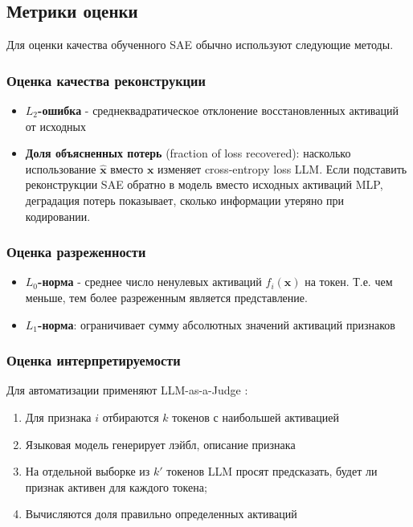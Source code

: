 \documentclass[a4paper,14pt]{extreport}
\begin{document}
\subsection{Метрики оценки}

Для оценки качества обученного SAE обычно используют следующие методы.

\subsubsection{Оценка качества реконструкции}

\begin{itemize}
    \item \textbf{$L_2$-ошибка} - среднеквадратическое отклонение восстановленных активаций от исходных
    \item \textbf{Доля объясненных потерь} (fraction of loss recovered): насколько
          использование $\hat{\mathbf{x}}$ вместо $\mathbf{x}$ изменяет cross-entropy loss
          LLM. Если подставить реконструкции SAE обратно в модель вместо
          исходных активаций MLP, деградация потерь показывает, сколько информации
          утеряно при кодировании.
\end{itemize}

\subsubsection{Оценка разреженности}

\begin{itemize}
    \item \textbf{$L_0$-норма} - среднее число ненулевых активаций $f_i(\mathbf{x})$ на токен.
          Т.е. чем меньше, тем более разреженным является представление.
    \item \textbf{$L_1$-норма}: ограничивает сумму абсолютных значений активаций признаков
\end{itemize}

\subsubsection{Оценка интерпретируемости}

Для автоматизации применяют LLM-as-a-Judge \cite{gu2024llmjudge}:
\begin{enumerate}
    \item Для признака $i$ отбираются $k$ токенов с наибольшей активацией
    \item Языковая модель генерирует лэйбл, описание признака
    \item На отдельной выборке из $k'$ токенов LLM
    просят предсказать, будет ли признак активен для каждого токена;
    \item Вычисляются доля правильно определенных активаций
\end{enumerate}
\end{document}

